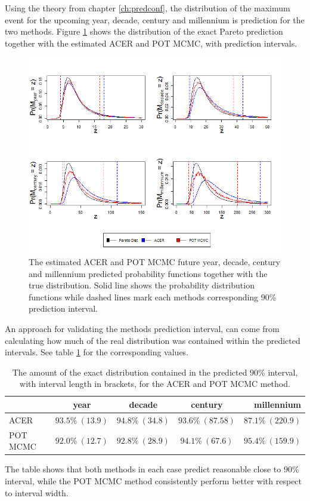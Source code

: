 Using the theory from chapter \ref{ch:predconf}, the distribution of the maximum event for the upcoming year, decade, century and millennium is prediction for the two methods. Figure \ref{fig:paretopred} shows the distribution of the exact Pareto prediction together with the estimated ACER and POT MCMC, with prediction intervals.
\begin{figure}
  \centering
    \includegraphics[width=1\textwidth]{fig/result/paretopred.png}
  \caption{The estimated ACER and POT MCMC future year, decade, century and millennium predicted probability functions together with the true distribution. Solid line shows the probability distribution functions while dashed lines mark each methods corresponding $90\%$ prediction interval.}
  \label{fig:paretopred}
\end{figure}

An approach for validating the methods prediction interval, can come from calculating how much of the real distribution was contained within the predicted intervals. See table \ref{table:paretopred} for the corresponding values. 
\begin{table}[h]
\centering
\begin{tabular}{ l c c c r}
    & year & decade &century & millennium \\
  \hline
  ACER& $93.5\% \ (13.9)$ & $94.8\% \ (34.8)$ & $93.6\% \ (87.58)$ & $87.1\% \ (220.9)$  \\
  POT MCMC& $92.0\% \ (12.7)$&$92.8\% \ (28.9)$&$94.1\% \ (67.6)$&$95.4\% \ (159.9)$ \\
\end{tabular}
\caption{The amount of the exact distribution contained in the predicted $90\%$ interval, with interval length in brackets, for the ACER and POT MCMC method.}
\label{table:paretopred}
\end{table}
The table shows that both methods in each case predict reasonable close to $90\%$ interval, while the POT MCMC method consistently perform better with respect to interval width.

